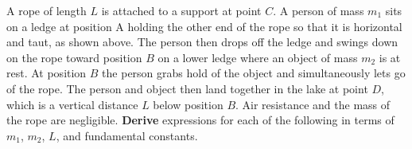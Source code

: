 \documentclass{../../../oss-apphys-exam}
\begin{document}
\begin{questions}
  \question A rope of length $L$ is attached to a support at point $C$. A person
  of mass $m_1$ sits on a ledge at position A holding the other end of the rope
  so that it is horizontal and taut, as shown above. The person then drops off
  the ledge and swings down on the rope toward position $B$ on a lower ledge
  where an object of mass $m_2$ is at rest. At position $B$ the person grabs
  hold of the object and simultaneously lets go of the rope. The person and
  object then land together in the lake at point $D$, which is a vertical
  distance $L$ below position $B$. Air resistance and the mass of the rope are
  negligible. \textbf{Derive} expressions for each of the following in terms of
  $m_1$, $m_2$, $L$, and fundamental constants.
\end{questions}
\end{document}
